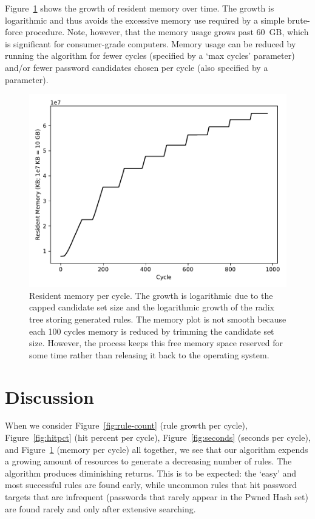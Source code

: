 \documentclass[letterpaper,twocolumn,10pt]{article}
\begin{document}
Figure~\ref{fig:memory} shows the growth of resident memory over time. The
growth is logarithmic and thus avoids the excessive memory use required by a
simple brute-force procedure. Note, however, that the memory usage grows past
60~GB, which is significant for consumer-grade computers. Memory usage can be
reduced by running the algorithm for fewer cycles (specified by a `max cycles'
parameter) and/or fewer password candidates chosen per cycle (also specified by
a parameter).

\begin{figure}[h]
\includegraphics[width=\linewidth]
{analysis/passwords-analysis/stats-res_mem_size.pdf}
\caption{Resident memory per cycle. The growth is logarithmic due to the capped
candidate set size and the logarithmic growth of the radix tree storing
generated rules. The memory plot is not smooth because each 100 cycles memory
is reduced by trimming the candidate set size. However, the process keeps this
free memory space reserved for some time rather than releasing it back to the
operating system.}
\label{fig:memory}
\end{figure}

\section{Discussion}
\label{sec:discussion}

When we consider Figure~\ref{fig:rule-count} (rule
growth per cycle), Figure~\ref{fig:hitpct} (hit percent per cycle),
Figure~\ref{fig:seconds} (seconds per cycle), and Figure~\ref{fig:memory}
(memory per cycle) all together, we see that our algorithm expends a growing
amount of resources to generate a decreasing number of rules. The algorithm
produces diminishing returns. This is to be expected: the `easy' and most
successful rules are found early, while uncommon rules that hit password
targets that are infrequent (passwords that rarely appear in the Pwned Hash
set) are found rarely and only after extensive searching.
\end{document}
